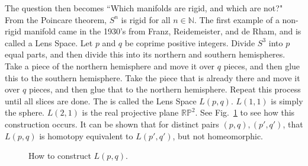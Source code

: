 \documentclass[oneside]{book}
\theoremstyle{mystyle}
\begin{document}
The question then becomes ``Which manifolds are rigid, and which are not?" From the Poincare theorem, $S^{n}$ is rigid for all $n\in \mathbb{N}$. The first example of a non-rigid manifold came in the 1930's from Franz, Reidemeister, and de Rham, and is called a Lens Space. Let $p$ and $q$ be coprime positive integers. Divide $S^{3}$ into $p$ equal parts, and then divide this into its northern and southern hemispheres. Take a piece of the northern hemisphere and move it over $q$ pieces, and then glue this to the southern hemisphere. Take the piece that is already there and move it over $q$ pieces, and then glue that to the northern hemisphere. Repeat this process until all slices are done. The is called the Lens Space $L(p,q)$. $L(1,1)$ is simply the sphere. $L(2,1)$ is the real projective plane $\mathbb{RP}^{2}$. See Fig.~\ref{fig:surgery_theory_lens_space_drawing} to see how this construction occurs. It can be shown that for distinct pairs $(p,q), (p',q')$, that $L(p,q)$ is homotopy equivalent to $L(p',q')$, but not homeomorphic.
\begin{figure}[H]
    \centering
    \caption{How to construct $L(p,q)$.}
    \label{fig:surgery_theory_lens_space_drawing}
\end{figure}
\end{document}
